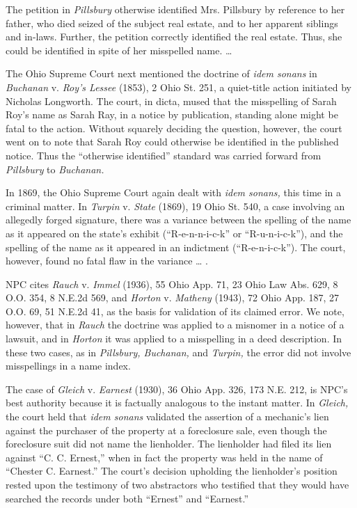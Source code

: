 The petition in \textit{Pillsbury} otherwise identified Mrs. Pillsbury by
reference to her father, who died seized of the subject real estate, and to her
apparent siblings and in-laws. Further, the petition correctly identified the
real estate. Thus, she could be identified in spite of her misspelled name.
\dots{}

The Ohio Supreme Court next mentioned the doctrine of \textit{idem sonans} in
\textit{Buchanan} v. \textit{Roy's Lessee} (1853), 2 Ohio St. 251, a
quiet-title action initiated by Nicholas Longworth. The court, in dicta, mused
that the misspelling of Sarah Roy's name as Sarah Ray, in a notice by
publication, standing alone might be fatal to the action. Without squarely
deciding the question, however, the court went on to note that Sarah Roy could
otherwise be identified in the published notice. Thus the ``otherwise
identified'' standard was carried forward from \textit{Pillsbury} to
\textit{Buchanan.}

In 1869, the Ohio Supreme Court again dealt with \textit{idem sonans,} this time
in a criminal matter. In \textit{Turpin} v. \textit{State} (1869), 19 Ohio St.
540, a case involving an allegedly forged signature, there was a variance
between the spelling of the name as it appeared on the state's exhibit
(``R-e-n-n-i-c-k'' or ``R-u-n-i-c-k''), and the spelling of the name as it
appeared in an indictment (``R-e-n-i-c-k''). The court, however, found no fatal
flaw in the variance \dots{} .

NPC cites \textit{Rauch} v. \textit{Immel} (1936), 55 Ohio App. 71, 23 Ohio Law
Abs. 629, 8 O.O. 354, 8 N.E.2d 569, and \textit{Horton} v. \textit{Matheny}
(1943), 72 Ohio App. 187, 27 O.O. 69, 51 N.E.2d 41, as the basis for validation
of its claimed error. We note, however, that in \textit{Rauch} the doctrine was
applied to a misnomer in a notice of a lawsuit, and in \textit{Horton} it was
applied to a misspelling in a deed description. In these two cases, as in
\textit{Pillsbury, Buchanan,} and \textit{Turpin,} the error did not involve
misspellings in a name index.

The case of \textit{Gleich} v. \textit{Earnest} (1930), 36 Ohio App. 326, 173
N.E. 212, is NPC's best authority because it is factually analogous to the
instant matter. In \textit{Gleich,} the court held that \textit{idem sonans}
validated the assertion of a mechanic's lien against the purchaser of the
property at a foreclosure sale, even though the foreclosure suit did not name
the lienholder. The lienholder had filed its lien against ``C. C. Ernest,''
when in fact the property was held in the name of ``Chester C. Earnest.'' The
court's decision upholding the lienholder's position rested upon the testimony
of two abstractors who testified that they would have searched the records
under both ``Ernest'' and ``Earnest.''


